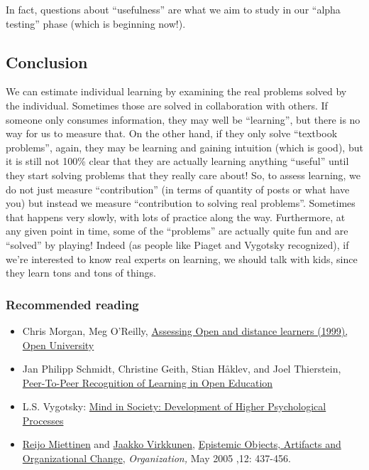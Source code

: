 In fact, questions about ``usefulness'' are what we aim to study in our
``alpha testing'' phase (which is beginning now!).

\subsection{Conclusion}

We can estimate individual learning by examining the real problems
solved by the individual. Sometimes those are solved in collaboration
with others. If someone only consumes information, they may well be
``learning'', but there is no way for us to measure that. On the other
hand, if they only solve ``textbook problems'', again, they may be
learning and gaining intuition (which is good), but it is still not
100\% clear that they are actually learning anything ``useful'' until
they start solving problems that they really care about! So, to assess
learning, we do not just measure ``contribution'' (in terms of quantity
of posts or what have you) but instead we measure ``contribution to
solving real problems''. Sometimes that happens very slowly, with lots
of practice along the way. Furthermore, at any given point in time, some
of the ``problems'' are actually quite fun and are ``solved'' by
playing! Indeed (as people like Piaget and Vygotsky recognized), if
we're interested to know real experts on learning, we should talk with
kids, since they learn tons and tons of things.

\subsubsection{Recommended reading}

\begin{itemize}
\item
  Chris Morgan, Meg O'Reilly,
  \href{http://books.google.com/books/about/Assessing\_Open\_and\_Distance\_Learners.html?id=wZcihyWRdIIC}{Assessing
  Open and distance learners (1999), Open University}
\item
  Jan Philipp Schmidt, Christine Geith, Stian Håklev, and Joel
  Thierstein,
  \href{http://www.irrodl.org/index.php/irrodl/article/view/641/1389}{Peer-To-Peer
  Recognition of Learning in Open Education}
\item
  L.S. Vygotsky:
  \href{http://books.google.com/books?id=RxjjUefze\_oC\&printsec=frontcover\&source=gbs\_atb\#v=onepage\&q\&f=false}{Mind
  in Society: Development of Higher Psychological Processes}
\item
  \href{http://org.sagepub.com/search?author1=Reijo+Miettinen\&sortspec=date\&submit=Submit}{Reijo
  Miettinen} and
  \href{http://org.sagepub.com/search?author1=Jaakko+Virkkunen\&sortspec=date\&submit=Submit}{Jaakko
  Virkkunen},
  \href{http://org.sagepub.com/content/12/3/437.abstract}{Epistemic
  Objects, Artifacts and Organizational Change}, \emph{Organization,}
  May 2005 ,12: 437-456.
\end{itemize}
